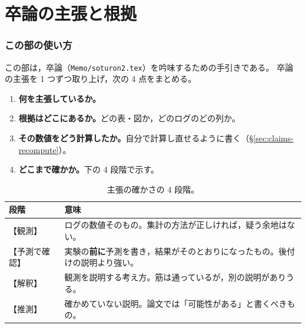 \documentclass[a4j, dvipdfmx]{jsarticle}  %
\begin{document}
\part{卒論の主張と根拠}
\label{part:claims}

\section{この部の使い方}
\label{sec:claims-howto}

この部は，卒論（\texttt{Memo/soturon2.tex}）を吟味するための手引きである。
卒論の主張を 1 つずつ取り上げ，次の 4 点をまとめる。
\begin{enumerate}
  \item \textbf{何を主張しているか。}
  \item \textbf{根拠はどこにあるか。}どの表・図か，どのログのどの列か。
  \item \textbf{その数値をどう計算したか。}自分で計算し直せるように書く（\S\ref{sec:claims-recompute}）。
  \item \textbf{どこまで確かか。}下の 4 段階で示す。
\end{enumerate}

\begin{table}[H]
\centering
\caption{主張の確かさの 4 段階。}
\label{tab:certainty}
\begin{tabular}{@{}P{3.4cm} P{11.9cm}@{}}
\toprule
段階 & 意味 \\
\midrule
【観測】 & ログの数値そのもの。集計の方法が正しければ，疑う余地はない。 \\
【予測で確認】 & 実験の\textbf{前に}予測を書き，結果がそのとおりになったもの。後付けの説明より強い。 \\
【解釈】 & 観測を説明する考え方。筋は通っているが，別の説明がありうる。 \\
【推測】 & 確かめていない説明。論文では「可能性がある」と書くべきもの。 \\
\bottomrule
\end{tabular}
\end{table}
\end{document}
